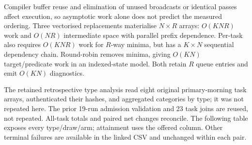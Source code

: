 \documentclass[12pt,a4paper]{article}
\begin{document}
Compiler buffer reuse and elimination of unused broadcasts or identical passes affect execution, so asymptotic work alone does not predict the measured ordering. Three vectorised replacements materialise $N\times R$ arrays: $O(KNR)$ work and $O(NR)$ intermediate space with parallel prefix dependence. Per-task also requires $O(KNR)$ work for $R$-way minima, but has a $K\times N$ sequential dependency chain. Round-robin removes minima, giving $O(KN)$ target/predicate work in an indexed-state model. Both retain $R$ queue entries and emit $O(KN)$ diagnostics.

The retained retrospective type analysis read eight original primary-morning task arrays, authenticated their hashes, and aggregated categories by type; it was not repeated here. The prior 19-run admission validation and 23 task joins are reused, not repeated. All-task totals and paired net changes reconcile. The following table exposes every type/draw/arm; attainment uses the offered column. Other terminal failures are available in the linked CSV and unchanged within each pair.
\end{document}
